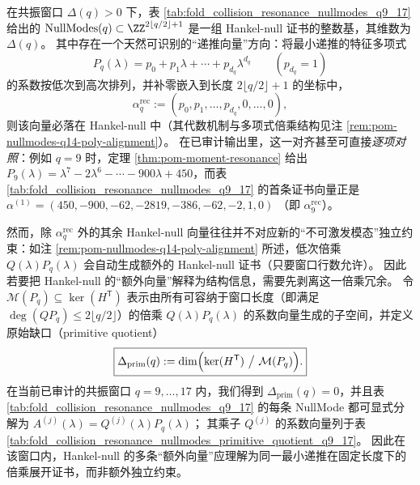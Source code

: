 



\begin{remark}\label{rem:pom-nullmodes-recurrence-plus-signature}
在共振窗口 \(\Delta(q)>0\) 下，表 \ref{tab:fold_collision_resonance_nullmodes_q9_17} 给出的
\(
\mathrm{NullModes}(q)\subset\ZZ^{2\lfloor q/2\rfloor+1}
\)
是一组 Hankel-null 证书的整数基，其维数为 \(\Delta(q)\)。
其中存在一个天然可识别的“递推向量”方向：将最小递推的特征多项式
\[
P_q(\lambda)=p_0+p_1\lambda+\cdots+p_{d_q}\lambda^{d_q}\qquad(p_{d_q}=1)
\]
的系数按低次到高次排列，并补零嵌入到长度 \(2\lfloor q/2\rfloor+1\) 的坐标中，
\[
\alpha^{\mathrm{rec}}_q:=(p_0,p_1,\ldots,p_{d_q},0,\ldots,0),
\]
则该向量必落在 Hankel-null 中（其代数机制与多项式倍乘结构见注 \ref{rem:pom-nullmodes-q14-poly-alignment}）。
在已审计输出里，这一对齐甚至可直接\emph{逐项对照}：例如 \(q=9\) 时，定理 \ref{thm:pom-moment-resonance} 给出
\(
P_9(\lambda)=\lambda^7-2\lambda^6-\cdots-900\lambda+450
\)，而表 \ref{tab:fold_collision_resonance_nullmodes_q9_17} 的首条证书向量正是
\(
\alpha^{(1)}=(450,-900,-62,-2819,-386,-62,-2,1,0)
\)
（即 \(\alpha^{\mathrm{rec}}_9\)）。
\par
然而，除 \(\alpha^{\mathrm{rec}}_q\) 外的其余 Hankel-null 向量往往并不对应新的“不可激发模态”独立约束：如注 \ref{rem:pom-nullmodes-q14-poly-alignment} 所述，低次倍乘 \(Q(\lambda)P_q(\lambda)\) 会自动生成额外的 Hankel-null 证书（只要窗口行数允许）。
因此若要把 Hankel-null 的“额外向量”解释为结构信息，需要先剥离这一倍乘冗余。
令 \(\mathcal{M}(P_q)\subseteq\ker(H^{\mathsf T})\) 表示由所有可容纳于窗口长度（即满足 \(\deg(QP_q)\le 2\lfloor q/2\rfloor\)）的倍乘 \(Q(\lambda)P_q(\lambda)\) 的系数向量生成的子空间，并定义原始缺口（primitive quotient）
\[
\boxed{
\Delta_{\mathrm{prim}}(q):=\dim\Bigl(\ker(H^{\mathsf T})\ \big/\ \mathcal{M}(P_q)\Bigr).
}
\]
在当前已审计的共振窗口 \(q=9,\dots,17\) 内，我们得到 \(\Delta_{\mathrm{prim}}(q)=0\)，并且表 \ref{tab:fold_collision_resonance_nullmodes_q9_17} 的每条 NullMode 都可显式分解为
\(
A^{(j)}(\lambda)=Q^{(j)}(\lambda)P_q(\lambda)
\)；
其乘子 \(Q^{(j)}\) 的系数向量列于表 \ref{tab:fold_collision_resonance_nullmodes_primitive_quotient_q9_17}。
因此在该窗口内，Hankel-null 的多条“额外向量”应理解为同一最小递推在固定长度下的倍乘展开证书，而非额外独立约束。
\end{remark}

